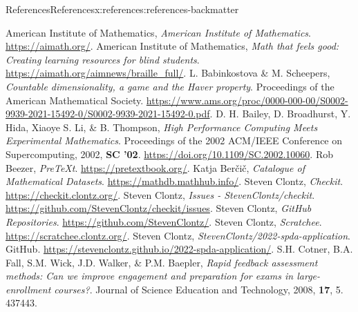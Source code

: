 \documentclass[oneside,10pt,]{article}
\begin{document}
\begin{references-section-numberless}{References}{}{References}{}{}{x:references:references-backmatter}
\begin{referencelist}
\hypertarget{x:biblio:biblio-aim}{}American Institute of Mathematics, \textit{American Institute of Mathematics}. \url{https://aimath.org/}.
\hypertarget{x:biblio:biblio-braille}{}American Institute of Mathematics, \textit{Math that feels good: Creating learning resources for blind students}. \url{https://aimath.org/aimnews/braille_full/}.
\hypertarget{x:biblio:biblio-scheepers}{}L. Babinkostova \& M. Scheepers, \textit{Countable dimensionality, a game and the Haver property}. Proceedings of the American Mathematical Society. \url{https://www.ams.org/proc/0000-000-00/S0002-9939-2021-15492-0/S0002-9939-2021-15492-0.pdf}.
\hypertarget{x:biblio:biblio-high-compute}{}D. H. Bailey, D. Broadhurst, Y. Hida, Xiaoye S. Li, \& B. Thompson, \textit{High Performance Computing Meets Experimental Mathematics}. Proceedings of the 2002 ACM\slash{}IEEE Conference on Supercomputing, 2002, \textbf{SC '02}. \url{https://doi.org/10.1109/SC.2002.10060}.
\hypertarget{x:biblio:biblio-pretext}{}Rob Beezer, \textit{PreTeXt}. \url{https://pretextbook.org/}.
\hypertarget{x:biblio:biblio-mathdb}{}Katja Berčič, \textit{Catalogue of Mathematical Datasets}. \url{https://mathdb.mathhub.info/}.
\hypertarget{x:biblio:biblio-checkit}{}Steven Clontz, \textit{Checkit}. \url{https://checkit.clontz.org/}.
\hypertarget{x:biblio:biblio-checkit-issues}{}Steven Clontz, \textit{Issues - StevenClontz\slash{}checkit}. \url{https://github.com/StevenClontz/checkit/issues}.
\hypertarget{x:biblio:biblio-ghclontz}{}Steven Clontz, \textit{GitHub Repositories}. \url{https://github.com/StevenClontz/}.
\hypertarget{x:biblio:biblio-scratchee}{}Steven Clontz, \textit{Scratchee}. \url{https://scratchee.clontz.org/}.
\hypertarget{x:biblio:biblio-repo}{}Steven Clontz, \textit{StevenClontz\slash{}2022-spda-application}. GitHub. \url{https://stevenclontz.github.io/2022-spda-application/}.
\hypertarget{x:biblio:biblio-ifat}{}S.H. Cotner, B.A. Fall, S.M. Wick, J.D. Walker, \& P.M. Baepler, \textit{Rapid feedback assessment methods: Can we improve engagement and preparation for exams in large-enrollment courses?}. Journal of Science Education and Technology, 2008, \textbf{17}, 5. 437\textendash{}443.

\end{referencelist}
\end{references-section-numberless}
\end{document}
